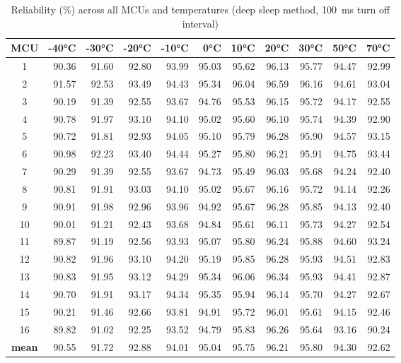 \begin{table}[ht!]
    \centering
    \begin{tabular}{c||rrrrrrrrrr}
    \toprule
    \textbf{MCU} & \textbf{-40°C} & \textbf{-30°C} & \textbf{-20°C} & \textbf{-10°C} & \textbf{0°C} & \textbf{10°C} & \textbf{20°C} & \textbf{30°C} & \textbf{50°C} & \textbf{70°C} \\
    \midrule
    1    &  90.36 &  91.60 &  92.80 &  93.99 & 95.03 & 95.62 & 96.13 & 95.77 & 94.47 & 92.99 \\
    2    &  91.57 &  92.53 &  93.49 &  94.43 & 95.34 & 96.04 & 96.59 & 96.16 & 94.61 & 93.04 \\
    3    &  90.19 &  91.39 &  92.55 &  93.67 & 94.76 & 95.53 & 96.15 & 95.72 & 94.17 & 92.55 \\
    4    &  90.78 &  91.97 &  93.10 &  94.10 & 95.02 & 95.60 & 96.10 & 95.74 & 94.39 & 92.90 \\
    5    &  90.72 &  91.81 &  92.93 &  94.05 & 95.10 & 95.79 & 96.28 & 95.90 & 94.57 & 93.15 \\
    6    &  90.98 &  92.23 &  93.40 &  94.44 & 95.27 & 95.80 & 96.21 & 95.91 & 94.75 & 93.44 \\
    7    &  90.29 &  91.39 &  92.55 &  93.67 & 94.73 & 95.49 & 96.03 & 95.68 & 94.24 & 92.40 \\
    8    &  90.81 &  91.91 &  93.03 &  94.10 & 95.02 & 95.67 & 96.16 & 95.72 & 94.14 & 92.26 \\
    9    &  90.91 &  91.98 &  92.96 &  93.96 & 94.92 & 95.67 & 96.28 & 95.85 & 94.13 & 92.40 \\
    10   &  90.01 &  91.21 &  92.43 &  93.68 & 94.84 & 95.61 & 96.11 & 95.73 & 94.27 & 92.54 \\
    11   &  89.87 &  91.19 &  92.56 &  93.93 & 95.07 & 95.80 & 96.24 & 95.88 & 94.60 & 93.24 \\
    12   &  90.82 &  91.96 &  93.10 &  94.20 & 95.19 & 95.85 & 96.28 & 95.93 & 94.51 & 92.83 \\
    13   &  90.83 &  91.95 &  93.12 &  94.29 & 95.34 & 96.06 & 96.34 & 95.93 & 94.41 & 92.87 \\
    14   &  90.70 &  91.91 &  93.17 &  94.34 & 95.35 & 95.94 & 96.14 & 95.70 & 94.27 & 92.67 \\
    15   &  90.21 &  91.46 &  92.66 &  93.81 & 94.91 & 95.72 & 96.01 & 95.61 & 94.15 & 92.46 \\
    16   &  89.82 &  91.02 &  92.25 &  93.52 & 94.79 & 95.83 & 96.26 & 95.64 & 93.16 & 90.24 \\
    \textbf{mean} &  90.55 &  91.72 &  92.88 &  94.01 & 95.04 & 95.75 & 96.21 & 95.80 & 94.30 & 92.62 \\
    \bottomrule
    \end{tabular}
    \captionsetup{justification=centering,margin=0.5cm}
    \caption{Reliability (\%) across all MCUs and temperatures (deep sleep method, 100~ms turn off interval)}
    \label{table:reliability_deep_sleep}
    \vspace{-0.7cm}
\end{table}


